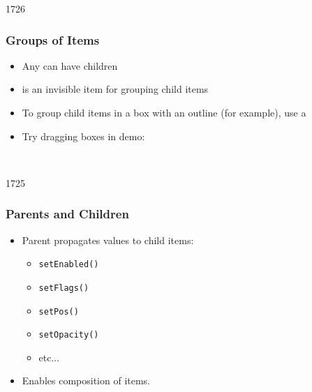 \begin{slide}{1726}
\frametitle{Groups of Items}
\begin{itemize}

\item Any  can have children 
\item {} is an invisible item for grouping child items
\item To group child items in a box with an outline (for example), use a  
\item Try dragging boxes in demo: 

\end{itemize}
\\
\medskip
{} 
\end{slide}

\begin{slide}{1725}
\frametitle{Parents and Children}
\begin{itemize}
\item Parent propagates values to child items:
    \begin{itemize}
    \item \texttt{setEnabled()}
    \item \texttt{setFlags()}
    \item \texttt{setPos()}
    \item \texttt{setOpacity()}
    \item etc...
    \end{itemize}
\item Enables composition of items.
\end{itemize}
\end{slide}

